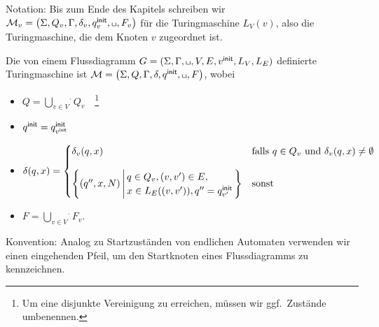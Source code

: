 Notation: Bis zum Ende des Kapitels schreiben wir
$\M_v=\left(\Sigma,Q_v,\Gamma,\delta_v,\qinit_v,\blank,F_v\right)$
für die Turingmaschine $L_V(v)$, also die Turingmaschine, die dem Knoten $v$ zugeordnet ist.

\begin{Def}%
Die von einem Flussdiagramm $G=(\Sigma, \Gamma, \blank,V,E,v^\mathsf{init},L_V,L_E)$ definierte Turingmaschine ist 
$\M=\left(\Sigma,Q,\Gamma,\delta,\qinit,\blank,F\right)$, wobei
\begin{itemize}
 \item $Q=\overset{.}{\bigcup\limits_{v\in V}} Q_v$~~\footnote{Um eine disjunkte Vereinigung zu erreichen, müssen wir ggf.\ Zustände umbenennen.}
 \item $q^\mathsf{init} = q^\mathsf{init}_{v^\mathsf{init}}$
 \item $\delta(q,x) = 
 \begin{cases}
 \delta_v(q,x) & \text{falls } q\in Q_v \text{ und }  \delta_v(q,x)\neq\emptyset \\[4mm]
 \left\{(q'',x,N) \,\middle|\, \begin{array}{@{}l@{\,}}
       q\in Q_v, (v,v')\in E,\\
       x\in L_E((v,v')), q''=\qinit_{{v'}}
      \end{array}\right\} & \text{sonst }
 \end{cases}$
 \item $F=\overset{.}{\bigcup\limits_{v\in V}} F_v$.
 \qedhere
\end{itemize}
\end{Def}

Konvention: Analog zu Startzuständen von endlichen Automaten verwenden wir einen eingehenden Pfeil, um den Startknoten eines Flussdiagramms zu kennzeichnen.

